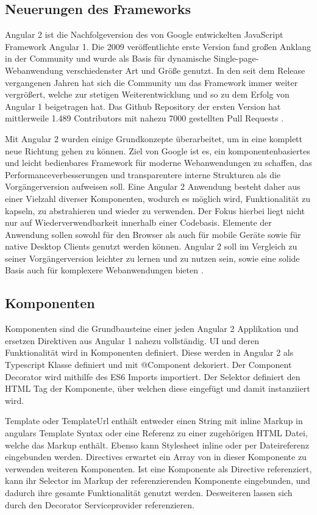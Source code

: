 \subsection{Neuerungen des Frameworks}

Angular 2 ist die Nachfolgeversion des von Google entwickelten JavaScript Framework Angular 1.
Die 2009 veröffentlichte erste Version fand großen Anklang in der Community
und wurde als Basis für dynamische Single-page-Webanwendung verschiedenster Art und Größe genutzt.
In den seit dem Release vergangenen Jahren hat sich die Community um das Framework immer weiter vergrößert,
welche zur stetigen Weiterentwicklung und so zu dem Erfolg von Angular 1 beigetragen hat.
Das Github Repository der ersten Version hat mittlerweile 1.489 Contributors mit nahezu 7000 gestellten Pull Requests \cite{ng1-github}.

Mit Angular 2 wurden einige Grundkonzepte überarbeitet, um in eine komplett neue Richtung gehen zu können.
Ziel von Google ist es, ein komponentenbasiertes und leicht bedienbares Framework für moderne
Webanwendungen zu schaffen, das Performanceverbesserungen und transparentere interne Strukturen als die Vorgängerversion aufweisen soll.
Eine Angular 2 Anwendung besteht daher aus einer Vielzahl diverser Komponenten, wodurch es möglich wird,
Funktionalität zu kapseln, zu abstrahieren und wieder zu verwenden. Der Fokus hierbei liegt nicht nur auf Wiederverwendbarkeit innerhalb einer Codebasis.
Elemente der Anwendung sollen sowohl für den Browser als auch für mobile Geräte sowie für native Desktop Clients genutzt werden können.
Angular 2 soll im Vergleich zu seiner Vorgängerversion leichter zu lernen und zu nutzen sein,
sowie eine solide Basis auch für komplexere Webanwendungen bieten \cite[11-12]{Angular2}.


\subsection{Komponenten}

Komponenten sind die Grundbausteine einer jeden Angular 2 Applikation und ersetzen Direktiven aus Angular 1 nahezu vollständig.
UI und deren Funktionalität wird in Komponenten definiert.
Diese werden in Angular 2 als Typescript Klasse definiert und mit @Component dekoriert.
Der Component Decorator wird mithilfe des ES6 Imports importiert.
Der Selektor definiert den HTML Tag der Komponente, über welchen diese eingefügt und damit instanziiert wird.

Template oder TemplateUrl enthält entweder einen String mit inline Markup in angulars Template Syntax
oder eine Referenz zu einer zugehörigen HTML Datei, welche das Markup enthält.
Ebenso kann Stylesheet inline oder per Dateireferenz eingebunden werden.
Directives erwartet ein Array von in dieser Komponente zu verwenden weiteren Komponenten.
Ist eine Komponente als Directive referenziert,
kann ihr Selector im Markup der referenzierenden Komponente eingebunden,
und dadurch ihre gesamte Funktionalität genutzt werden.
Desweiteren lassen sich durch den Decorator Serviceprovider referenzieren.

